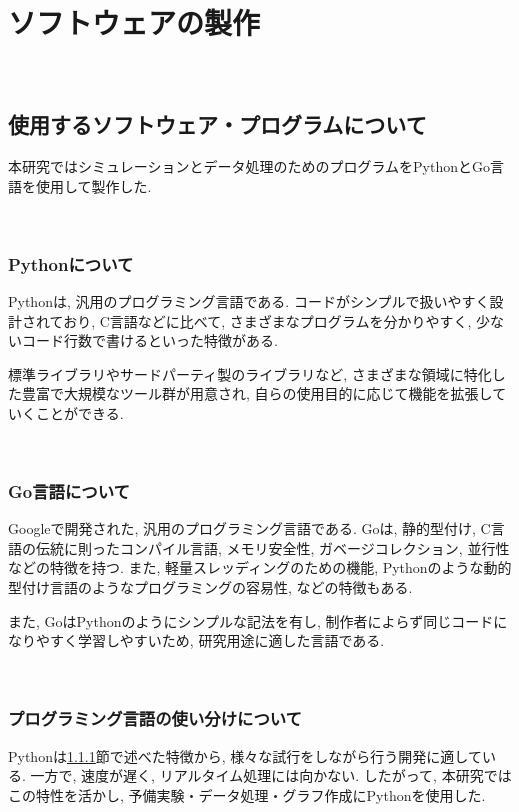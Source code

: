 \chapter{ソフトウェアの製作}\label{software}

\
\section{使用するソフトウェア・プログラムについて}\label{about-program}

本研究ではシミュレーションとデータ処理のためのプログラムをPythonとGo言語を使用して製作した. 

\
\subsection{Pythonについて}\label{about-python}

Pythonは, 汎用のプログラミング言語である. コードがシンプルで扱いやすく設計されており, C言語などに比べて, さまざまなプログラムを分かりやすく, 少ないコード行数で書けるといった特徴がある. 

標準ライブラリやサードパーティ製のライブラリなど, さまざまな領域に特化した豊富で大規模なツール群が用意され, 自らの使用目的に応じて機能を拡張していくことができる. 


\
\subsection{Go言語について}\label{about-go}

Googleで開発された, 汎用のプログラミング言語である. Goは, 静的型付け, C言語の伝統に則ったコンパイル言語, メモリ安全性, ガベージコレクション, 並行性などの特徴を持つ. また, 軽量スレッディングのための機能, Pythonのような動的型付け言語のようなプログラミングの容易性, などの特徴もある. 

また, GoはPythonのようにシンプルな記法を有し, 制作者によらず同じコードになりやすく学習しやすいため, 研究用途に適した言語である. 

\
\subsection{プログラミング言語の使い分けについて}\label{about-proper-use}

Pythonは\ref{about-python}節で述べた特徴から, 様々な試行をしながら行う開発に適している. 一方で, 速度が遅く, リアルタイム処理には向かない. したがって, 本研究ではこの特性を活かし, 予備実験・データ処理・グラフ作成にPythonを使用した. 

